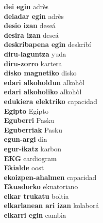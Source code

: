 \textbf{ dei egin  } adrès \\
\textbf{ deiadar egin  } adrès \\
\textbf{ desio izan  } deseá \\
\textbf{ desira izan  } deseá \\
\textbf{ deskribapena egin  } deskribí \\
\textbf{ diru-laguntza  } yuda \\
\textbf{ diru-zorro  } kartera \\
\textbf{ disko magnetiko  } disko \\
\textbf{ edari alkoholdun  } alkohòl \\
\textbf{ edari alkoholiko  } alkohòl \\
\textbf{ edukiera elektriko  } capacidad \\
\textbf{ Egipto  } Egipto \\
\textbf{ Eguberri  } Pasku \\
\textbf{ Eguberriak  } Pasku \\
\textbf{ egun-argi  } dia \\
\textbf{ egur-ikatz  } karbon \\
\textbf{ EKG  } cardiogram \\
\textbf{ Ekialde  } oost \\
\textbf{ ekoizpen-ahalmen  } capacidad \\
\textbf{ Ekuadorko  } ekuatoriano \\
\textbf{ elkar trukatu  } boltia \\
\textbf{ elkarlanean ari izan  } kolaborá \\
\textbf{ elkarri egin  } cambia \\

